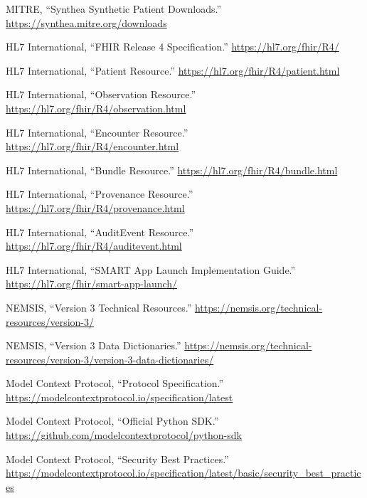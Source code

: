 \documentclass[10pt]{article}
\begin{document}
\small
\begin{enumerate}[label={[\arabic*]}]
  \item MITRE, ``Synthea Synthetic Patient Downloads.'' \url{https://synthea.mitre.org/downloads}
  \item HL7 International, ``FHIR Release 4 Specification.'' \url{https://hl7.org/fhir/R4/}
  \item HL7 International, ``Patient Resource.'' \url{https://hl7.org/fhir/R4/patient.html}
  \item HL7 International, ``Observation Resource.'' \url{https://hl7.org/fhir/R4/observation.html}
  \item HL7 International, ``Encounter Resource.'' \url{https://hl7.org/fhir/R4/encounter.html}
  \item HL7 International, ``Bundle Resource.'' \url{https://hl7.org/fhir/R4/bundle.html}
  \item HL7 International, ``Provenance Resource.'' \url{https://hl7.org/fhir/R4/provenance.html}
  \item HL7 International, ``AuditEvent Resource.'' \url{https://hl7.org/fhir/R4/auditevent.html}
  \item HL7 International, ``SMART App Launch Implementation Guide.'' \url{https://hl7.org/fhir/smart-app-launch/}
  \item NEMSIS, ``Version 3 Technical Resources.'' \url{https://nemsis.org/technical-resources/version-3/}
  \item NEMSIS, ``Version 3 Data Dictionaries.'' \url{https://nemsis.org/technical-resources/version-3/version-3-data-dictionaries/}
  \item Model Context Protocol, ``Protocol Specification.'' \url{https://modelcontextprotocol.io/specification/latest}
  \item Model Context Protocol, ``Official Python SDK.'' \url{https://github.com/modelcontextprotocol/python-sdk}
  \item Model Context Protocol, ``Security Best Practices.'' \url{https://modelcontextprotocol.io/specification/latest/basic/security_best_practices}
\end{enumerate}
\end{document}
